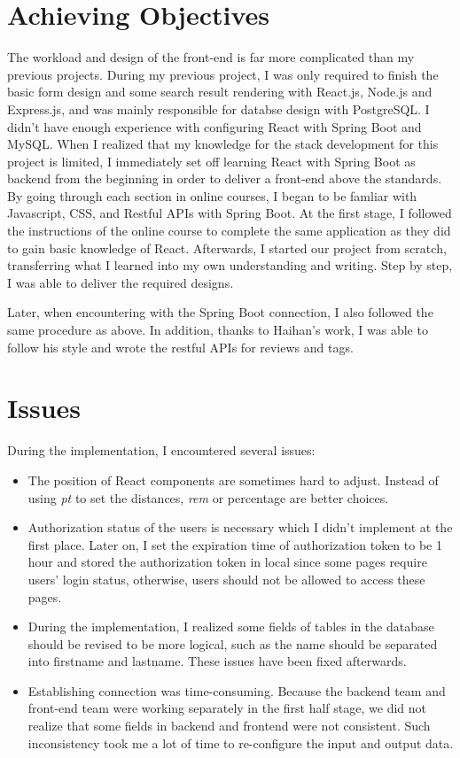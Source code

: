 \documentclass[12pt]{article}
\begin{document}
\section{Achieving Objectives}
The workload and design of the front-end is far more complicated than my previous projects. During my previous project, I was only required to finish the basic form design and some search result rendering with React.js, Node.js and Express.js, and was mainly responsible for databse design with PostgreSQL. I didn't have enough experience with configuring React with Spring Boot and MySQL. When I realized that my knowledge for the stack development for this project is limited, I immediately set off learning React with Spring Boot as backend from the beginning in order to deliver a front-end above the standards. By going through each section in online courses, I began to be famliar with Javascript, CSS, and Restful APIs with Spring Boot. At the first stage, I followed the instructions of the online course to complete the same application as they did to gain basic knowledge of React. Afterwards, I started our project from scratch, transferring what I learned into my own understanding and writing. Step by step, I was able to deliver the required designs. 

Later, when encountering with the Spring Boot connection, I also followed the same procedure as above. In addition, thanks to Haihan's work, I was able to follow his style and wrote the restful APIs for reviews and tags.
\section{Issues}
During the implementation, I encountered several issues:
\begin{itemize}
    \item The position of React components are sometimes hard to adjust. Instead of using \textit{pt} to set the distances, \textit{rem} or percentage are better choices.
    \item Authorization status of the users is necessary which I didn't implement at the first place. Later on, I set the expiration time of authorization token to be 1 hour and stored the authorization token in local since some pages require users' login status, otherwise, users should not be allowed to access these pages.
    \item During the implementation, I realized some fields of tables in the database should be revised to be more logical, such as the name should be separated into firstname and lastname. These issues have been fixed afterwards.
    \item Establishing connection was time-consuming. Because the backend team and front-end team were working separately in the first half stage, we did not realize that some fields in backend and frontend were not consistent. Such inconsistency took me a lot of time to re-configure the input and output data. 
\end{itemize}
\end{document}
